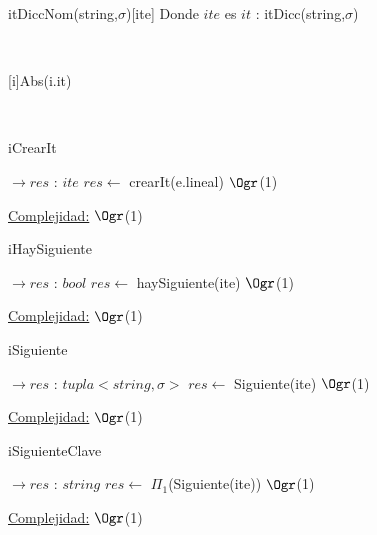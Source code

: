 \begin{Representacion}


	\begin{Estructura}{itDiccNom(string,$\sigma$)}[ite]
		Donde $ite$ es $it$ :  itDicc(string,$\sigma$)
	\end{Estructura}
		

~
	
	{Abs(i.it)}
	
~

	\begin{algorithm}[H]
		\caption{iCrearIt}
		\begin{algorithmic}
			 $\to res$ : $ite$
				\State $res \gets$ crearIt(e.lineal) \Comment $\Ogr$(1)
			\EndProcedure
		\end{algorithmic}
		\underline{Complejidad:} $\Ogr$(1)
	\end{algorithm}
	
	\begin{algorithm}[H]
		\caption{iHaySiguiente}
		\begin{algorithmic}
			 $\to res$ : $bool$
				\State $res \gets$ haySiguiente(ite) \Comment $\Ogr$(1)
			\EndProcedure
		\end{algorithmic}
		\underline{Complejidad:} $\Ogr$(1)
	\end{algorithm}
	
	\begin{algorithm}[H]
		\caption{iSiguiente}
		\begin{algorithmic}
			 $\to res$ : $tupla<string,\sigma>$
				\State $res \gets$ Siguiente(ite) \Comment $\Ogr$(1)
			\EndProcedure
		\end{algorithmic}
		\underline{Complejidad:} $\Ogr$(1)
	\end{algorithm}
	
	\begin{algorithm}[H]
		\caption{iSiguienteClave}
		\begin{algorithmic}
			 $\to res$ : $string$
				\State $res \gets$ $\Pi_1$(Siguiente(ite)) \Comment $\Ogr$(1)
			\EndProcedure
		\end{algorithmic}
		\underline{Complejidad:} $\Ogr$(1)
	\end{algorithm}
	

\end{Representacion}
